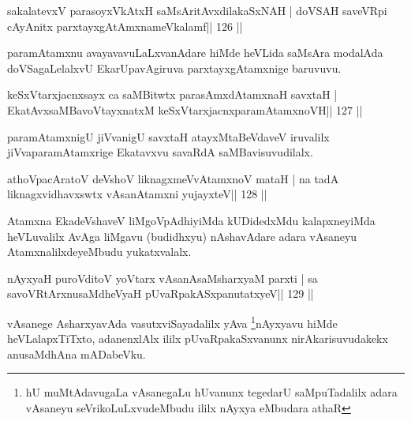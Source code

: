 
\begin{shl}
sakalatevxV parasoyxVkAtxH saMsAritAvxdilakaSxNAH |
doVSAH saveVR\s pi cA\s\s yAnitx parxtayxgAtAmxnameVkalamf\hfill || 126 ||
\end{shl}

\begin{artha}
paramAtamxnu avayavavuLaLxvanAdare hiMde heVLida saMsAra modalAda
doVSagaLelalxvU EkarUpavAgiruva parxtayxgAtamxnige baruvuvu.
\end{artha}

\begin{shl}
keSxVtarxjacnxsayx ca saMBitwtx parasAmxdAtamxnaH savxtaH |
EkatAvxsaMBavoV\s tayxnatxM keSxVtarxjacnxparamAtamxnoVH\hfill || 127 ||
\end{shl}

\begin{artha}
paramAtamxnigU jiVvanigU savxtaH atayxMtaBeVdaveV iruvalilx
jiVvaparamAtamxrige Ekatavxvu savaRdA saMBavisuvudilalx.
\end{artha}


\begin{shl}
athoVpacAratoV deVshoV liknagxmeVvA\s\s tamxnoV mataH |
na tadA liknagxvidhavxswtx vAsanA\s\s tamxni yujayxteV\hfill || 128 ||
\end{shl}

\begin{artha}
Atamxna EkadeVshaveV liMgoVpAdhiyiMda kUDidedxMdu kalapxneyiMda heVLuvalilx AvAga liMgavu (budidhxyu) nAshavAdare adara vAsaneyu AtamxnalilxdeyeMbudu yukatxvalalx.
\end{artha}

\begin{shl}
nAyxyaH puroVditoV yoV\s tarx vAsanAsaMsharxyaM parxti |
sa savoVR\s tArxnusaMdheVyaH pUvaRpakASxpanutatxyeV\hfill || 129 ||
\end{shl}

\begin{artha}
vAsanege AsharxyavAda vasutxviSayadalilx yAva \footnote{hU   muMtAdavugaLa vAsanegaLu hUvanunx tegedarU saMpuTadalilx   adara vAsaneyu seVrikoLuLxvudeMbudu ililx nAyxya eMbudara athaR}nAyxyavu hiMde heVLalapxTiTxto, adanenxlAlx ililx pUvaRpakaSxvanunx nirAkarisuvudakekx anusaMdhAna mADabeVku.
\end{artha}


